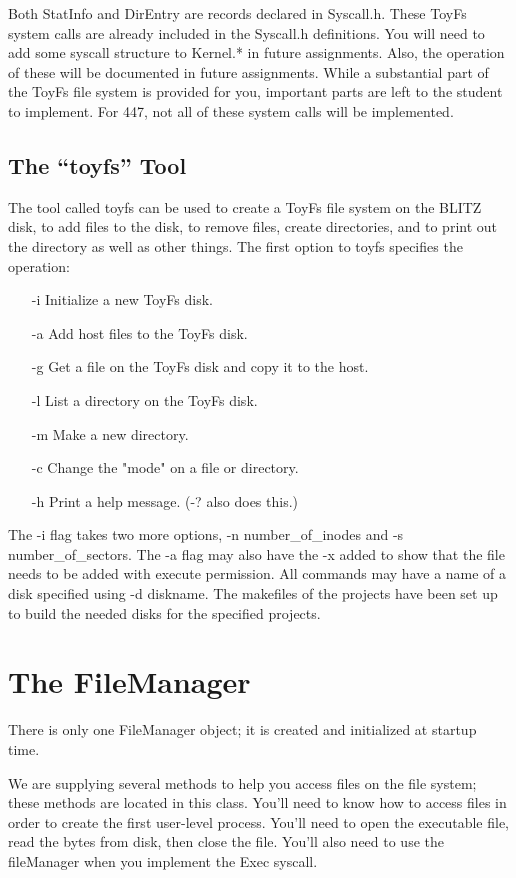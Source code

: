 \documentclass[12pt]{article}
\begin{document}
Both StatInfo and DirEntry are records declared in Syscall.h.  These
ToyFs system calls are already included in the Syscall.h definitions.
You will need to add some syscall structure to Kernel.* in future
assignments.  Also, the operation of these will be documented in
future assignments.  While a substantial part of the ToyFs file system
is provided for you, important parts are left to the student to
implement.  For 447, not all of these system calls will be implemented.

\subsection{The ``toyfs'' Tool}

The tool called toyfs can be used to create a ToyFs file system on the
BLITZ disk, to add files to the disk, to remove files, create
directories, and to print out the directory as well as other things.
The first option to toyfs specifies the operation:
\begin{itemize}
\item[-i]	Initialize a new ToyFs disk.
\item[-a]	Add host files to the ToyFs disk.
\item[-g]	Get a file on the ToyFs disk and copy it to the host.
\item[-l]	List a directory on the ToyFs disk.
\item[-m]	Make a new directory.
\item[-c]	Change the "mode" on a file or directory.
\item[-h]	Print a help message.  (-? also does this.)
 \end{itemize}

The -i flag takes two more options, -n number\_of\_inodes and -s
number\_of\_sectors.  The -a flag may also have the -x added to show
that the file needs to be added with execute permission.  All commands
may have a name of a disk specified using -d diskname.  The makefiles
of the projects have been set up to build the needed disks for the
specified projects.

\section{The FileManager}

There is only one FileManager object; it is created and initialized at
startup time.

We are supplying several methods to help you access files on the
 file system; these methods are located in this class.  You'll
need to know how to access files in order to create the first
user-level process.  You'll need to open the executable file, read the
bytes from disk, then close the file.  You'll also need to use the
fileManager when you implement the Exec syscall.
\end{document}
